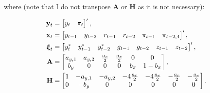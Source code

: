 \documentclass[a4paper,12pt]{article}
\begin{document}
\bigskip 

\bigskip 

\bigskip 

\bigskip 

\bigskip 

\bigskip 

\bigskip

\bigskip

\bigskip where (note that I do not transpose $\mathbf{A}$ or $\mathbf{H}$ as
it is not necessary):

\begin{align*}
\mathbf{y}_{t}& =%
\begin{bmatrix}
y_{t} & \pi _{t}%
\end{bmatrix}%
^{\prime }, \\
\mathbf{x}_{t}& =%
\begin{bmatrix}
y_{t-1} & y_{t-2} & r_{t-1} & r_{t-2} & \pi _{t-1} & \pi _{t-2,4}%
\end{bmatrix}%
^{\prime }, \\
\boldsymbol{\xi }_{t}& =%
\begin{bmatrix}
y_{t}^{\ast } & y_{t-1}^{\ast } & y_{t-2}^{\ast } & g_{t-1} & g_{t-2} & 
z_{t-1} & z_{t-2}%
\end{bmatrix}%
^{\prime }, \\
\mathbf{A}& =%
\begin{bmatrix}
a_{y,1} & a_{y,2} & \frac{a_{r}}{2} & \frac{a_{r}}{2} & 0 & 0 \\ 
b_{y} & 0 & 0 & 0 & b_{\pi } & 1-b_{\pi }%
\end{bmatrix}%
, \\
\mathbf{H}& =%
\begin{bmatrix}
1 & -a_{y,1} & -a_{y,2} & -4\frac{a_{r}}{2} & -4\frac{a_{r}}{2} & -\frac{%
a_{r}}{2} & -\frac{a_{r}}{2} \\ 
0 & -b_{y} & 0 & 0 & 0 & 0 & 0%
\end{bmatrix}%
.
\end{align*}

\bigskip

\bigskip

\bigskip

\bigskip

\bigskip

\bigskip

\bigskip

\bigskip

\bigskip

\bigskip

\bigskip

\bigskip

\bigskip

\bigskip

\bigskip

\bigskip

\bigskip

\bigskip

\bigskip

\bigskip

\bigskip

\bigskip

\bigskip

\bigskip

\bigskip
\end{document}
